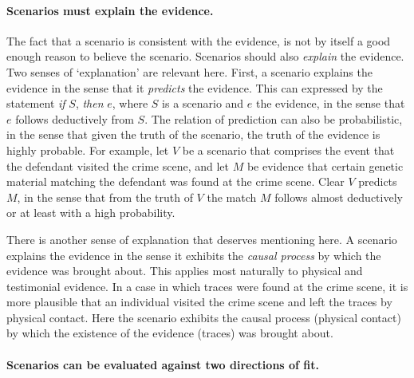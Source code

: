 \documentclass[10pt]{article}
\begin{document}
\paragraph{Scenarios must explain the evidence.}

The fact that a scenario is consistent 
with the evidence, is not by itself a good enough reason to believe the scenario. 
Scenarios should also \textit{explain} the evidence. 
Two senses of `explanation' are relevant here. First, 
a scenario explains the evidence in the sense that it \textit{predicts} the evidence. 
This can expressed by the statement \textit{if} $S$, \textit{then} $e$, 
where $S$ is a scenario and $e$ the evidence, in the sense that $e$ 
follows deductively from $S$. The relation of prediction can also be probabilistic, in the sense that given the truth of the scenario, 
the truth of the evidence is highly probable. 
For example, let $V$ be a scenario that comprises the event that the defendant visited the crime scene, and let $M$ be 
evidence that certain genetic material matching the defendant 
was found at the crime scene. Clear $V$ predicts $M$, in the sense that from the truth of $V$
 the match $M$ follows almost deductively or at least with a high probability.  

There is another sense of explanation that deserves mentioning here. 
A scenario explains the evidence in the sense it exhibits the \textit{causal process} by which the evidence 
was brought about. This applies most naturally to physical and testimonial evidence. 
In a case in which traces were found at the crime scene, 
it is more plausible that an individual visited the crime scene 
and left the traces by physical contact. Here the scenario exhibits the causal process (physical contact) 
by which the existence of the evidence 
(traces) was brought about. 

\paragraph{Scenarios can be evaluated against two directions of fit.}
\end{document}
